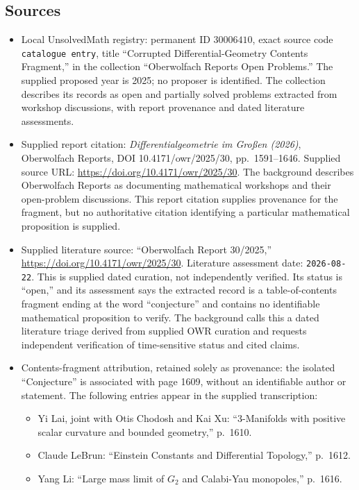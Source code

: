 \documentclass[11pt]{article}
\begin{document}
\subsection{Sources}
\begin{itemize}
\item Local UnsolvedMath registry: permanent ID \(30006410\), exact source code \texttt{catalogue entry}, title ``Corrupted Differential-Geometry Contents Fragment,'' in the collection ``Oberwolfach Reports Open Problems.'' The supplied proposed year is 2025; no proposer is identified. The collection describes its records as open and partially solved problems extracted from workshop discussions, with report provenance and dated literature assessments.
\item Supplied report citation: \emph{Differentialgeometrie im Großen (2026)}, Oberwolfach Reports, DOI 10.4171/owr/2025/30, pp.\ 1591--1646. Supplied source URL: \url{https://doi.org/10.4171/owr/2025/30}. The background describes Oberwolfach Reports as documenting mathematical workshops and their open-problem discussions. This report citation supplies provenance for the fragment, but no authoritative citation identifying a particular mathematical proposition is supplied.
\item Supplied literature source: ``Oberwolfach Report 30/2025,'' \url{https://doi.org/10.4171/owr/2025/30}. Literature assessment date: \texttt{2026-08-22}. This is supplied dated curation, not independently verified. Its status is ``open,'' and its assessment says the extracted record is a table-of-contents fragment ending at the word ``conjecture'' and contains no identifiable mathematical proposition to verify. The background calls this a dated literature triage derived from supplied OWR curation and requests independent verification of time-sensitive status and cited claims.
\item Contents-fragment attribution, retained solely as provenance: the isolated ``Conjecture'' is associated with page 1609, without an identifiable author or statement. The following entries appear in the supplied transcription:
\begin{itemize}
\item Yi Lai, joint with Otis Chodosh and Kai Xu: ``3-Manifolds with positive scalar curvature and bounded geometry,'' p.\ 1610.
\item Claude LeBrun: ``Einstein Constants and Differential Topology,'' p.\ 1612.
\item Yang Li: ``Large mass limit of \(G_2\) and Calabi-Yau monopoles,'' p.\ 1616.

\end{itemize}
\end{itemize}
\end{document}

